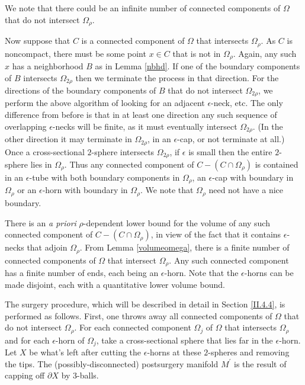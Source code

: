 We note that there could be an infinite number of connected components of
$\Omega$ that do not intersect $\Omega_\rho$.

Now suppose that $C$ is a connected component of $\Omega$ that intersects
$\Omega_\rho$. As $C$ is noncompact, there must be some point $x \in C$ that is
not in $\Omega_\rho$. Again, any such $x$ has a neighborhood $B$ as in Lemma
\ref{nbhd}.
If one of the boundary components of $B$ intersects
$\Omega_{2\rho}$ then we terminate the process in that direction.
For the directions of the boundary components of $B$ that do not
intersect $\Omega_{2\rho}$,
we perform the above algorithm of looking for an adjacent
$\epsilon$-neck, etc.
The only difference from before
is that in at
least one direction any such
sequence of overlapping $\epsilon$-necks will be finite, as it must
eventually intersect
$\Omega_{2\rho}$.
(In the other direction it may terminate
in $\Omega_{2\rho}$, in an $\epsilon$-cap, or not terminate at all.)
Once a cross-sectional $2$-sphere intersects $\Omega_{2\rho}$, if
$\epsilon$ is small then the entire $2$-sphere lies in $\Omega_\rho$.
Thus any connected component of $C - (C \cap \Omega_\rho)$
is contained in an $\epsilon$-tube with both boundary components in $\Omega_\rho$,
an $\epsilon$-cap with boundary in $\Omega_\rho$ or an $\epsilon$-horn with boundary in
$\Omega_\rho$. We note that $\Omega_\rho$ need not have a nice boundary.

There is an {\it a priori} $\rho$-dependent lower bound for the volume of any such
connected component of $C - (C \cap \Omega_\rho)$, in view of the fact that
it contains $\epsilon$-necks that adjoin $\Omega_\rho$.
From Lemma \ref{volumeomega},
there is a finite number of connected components of $\Omega$ that
intersect $\Omega_\rho$. Any such connected component has a finite
number of ends, each being an $\epsilon$-horn. Note that the
$\epsilon$-horns can be made disjoint, each with a quantitative lower
volume bound.

The surgery procedure, which will be described in detail in Section
\ref{II.4.4}, is performed as follows.  First, one throws away all
connected components of $\Omega$ that do not intersect $\Omega_\rho$.
For each connected component $\Omega_j$ of $\Omega$ that intersects
$\Omega_\rho$ and for each $\epsilon$-horn of $\Omega_j$, take
a cross-sectional sphere that lies far in the $\epsilon$-horn.
Let $X$ be what's left after cutting the $\epsilon$-horns
at these $2$-spheres and removing the tips. The
(possibly-disconnected) postsurgery manifold $M^\prime$ is the
result of capping off $\partial X$ by $3$-balls.

